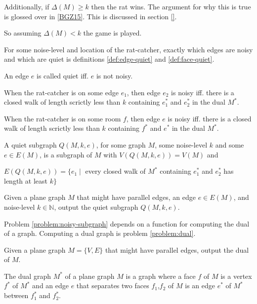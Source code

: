 \documentclass{article}
\begin{document}
	Additionally, if $\Delta(M) \geq k$ then the rat wins. The argument for why this is true is glossed over in \ref{BGZ15}. This is discussed in section \ref{}.

	So assuming $\Delta(M) < k$ the game is played.

	For some noise-level and location of the rat-catcher, exactly which edges are noisy and which are quiet is definitions \ref{def:edge-quiet} and \ref{def:face-quiet}.

	An edge $e$ is called quiet iff. $e$ is not noisy.

	\begin{definition}\label{def:edge-quiet}
		When the rat-catcher is on some edge $e_1$, then edge $e_2$ is noisy iff. there is a closed walk of length scrictly less than $k$ containing $e_1^*$ and $e_2^*$ in the dual $M^*$.
	\end{definition}

	\begin{definition}\label{def:face-quiet}
		When the rat-catcher is on some room $f$, then edge $e$ is noisy iff. there is a closed walk of length scrictly less than $k$ containing $f^*$ and $e^*$ in the dual $M^*$.
	\end{definition}

	A quiet subgraph $Q(M, k, e)$, for some graph $M$, some noise-level $k$ and some $e \in E(M)$, is a subgraph of $M$ with $V(Q(M, k, e)) = V(M)$ and

	$E(Q(M, k, e)) = \{e_1 \mid$ every closed walk of $M^*$ containing $e_1^*$ and $e_2^*$ has length at least $k\}$

	\begin{problem}\label{problem:noisy-subgraph}
		Given a plane graph $M$ that might have parallel edges, an edge $e \in E(M)$, and noise-level $k \in \mathbb{N}$, output the quiet subgraph $Q(M, k, e)$.
	\end{problem}

	Problem \ref{problem:noisy-subgraph} depends on a function for computing the dual of a graph. Computing a dual graph is problem \ref{problem:dual}.

	\begin{problem}\label{problem:dual}
		Given a plane graph $M = \{V, E\}$ that might have parallel edges, output the dual of $M$.
	\end{problem}

	\begin{definition}
		The dual graph $M^*$ of a plane graph $M$ is a graph where a face $f$ of $M$ is a vertex $f^*$ of $M^*$ and an edge $e$ that separates two faces $f_1$,$f_2$ of $M$ is an edge $e^*$ of $M^*$ between $f_1^*$ and $f_2^*$.
	\end{definition}
	
\end{document}
